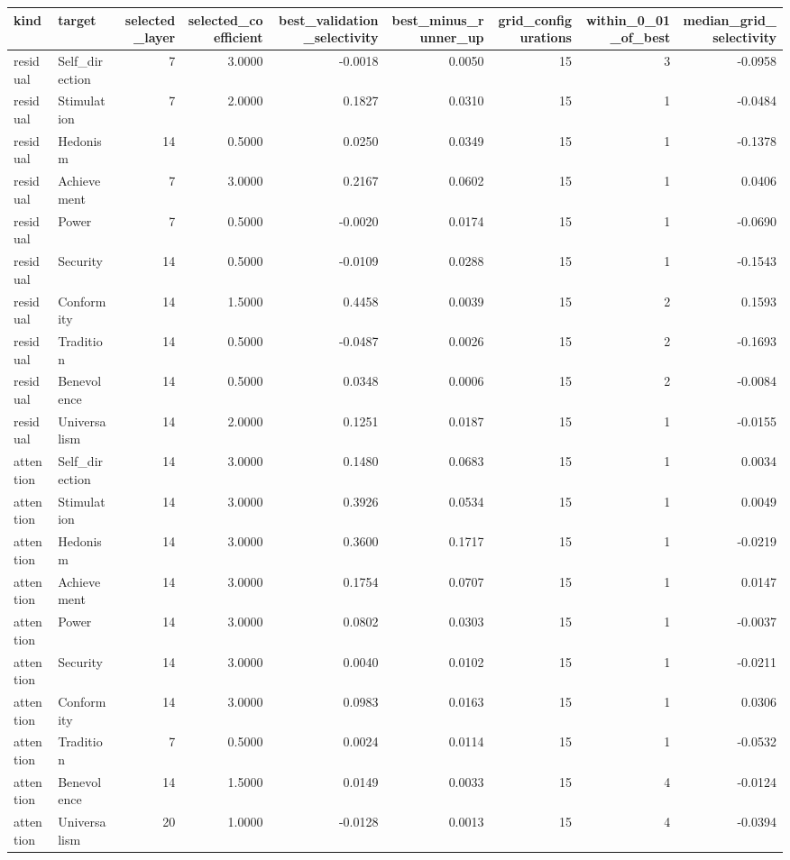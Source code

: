 \begin{tabular}{llrrrrrrr}
\toprule
kind & target & selected\_layer & selected\_coefficient & best\_validation\_selectivity & best\_minus\_runner\_up & grid\_configurations & within\_0\_01\_of\_best & median\_grid\_selectivity \\
\midrule
residual & Self\_direction & 7 & 3.0000 & -0.0018 & 0.0050 & 15 & 3 & -0.0958 \\
residual & Stimulation & 7 & 2.0000 & 0.1827 & 0.0310 & 15 & 1 & -0.0484 \\
residual & Hedonism & 14 & 0.5000 & 0.0250 & 0.0349 & 15 & 1 & -0.1378 \\
residual & Achievement & 7 & 3.0000 & 0.2167 & 0.0602 & 15 & 1 & 0.0406 \\
residual & Power & 7 & 0.5000 & -0.0020 & 0.0174 & 15 & 1 & -0.0690 \\
residual & Security & 14 & 0.5000 & -0.0109 & 0.0288 & 15 & 1 & -0.1543 \\
residual & Conformity & 14 & 1.5000 & 0.4458 & 0.0039 & 15 & 2 & 0.1593 \\
residual & Tradition & 14 & 0.5000 & -0.0487 & 0.0026 & 15 & 2 & -0.1693 \\
residual & Benevolence & 14 & 0.5000 & 0.0348 & 0.0006 & 15 & 2 & -0.0084 \\
residual & Universalism & 14 & 2.0000 & 0.1251 & 0.0187 & 15 & 1 & -0.0155 \\
attention & Self\_direction & 14 & 3.0000 & 0.1480 & 0.0683 & 15 & 1 & 0.0034 \\
attention & Stimulation & 14 & 3.0000 & 0.3926 & 0.0534 & 15 & 1 & 0.0049 \\
attention & Hedonism & 14 & 3.0000 & 0.3600 & 0.1717 & 15 & 1 & -0.0219 \\
attention & Achievement & 14 & 3.0000 & 0.1754 & 0.0707 & 15 & 1 & 0.0147 \\
attention & Power & 14 & 3.0000 & 0.0802 & 0.0303 & 15 & 1 & -0.0037 \\
attention & Security & 14 & 3.0000 & 0.0040 & 0.0102 & 15 & 1 & -0.0211 \\
attention & Conformity & 14 & 3.0000 & 0.0983 & 0.0163 & 15 & 1 & 0.0306 \\
attention & Tradition & 7 & 0.5000 & 0.0024 & 0.0114 & 15 & 1 & -0.0532 \\
attention & Benevolence & 14 & 1.5000 & 0.0149 & 0.0033 & 15 & 4 & -0.0124 \\
attention & Universalism & 20 & 1.0000 & -0.0128 & 0.0013 & 15 & 4 & -0.0394 \\
\bottomrule
\end{tabular}
